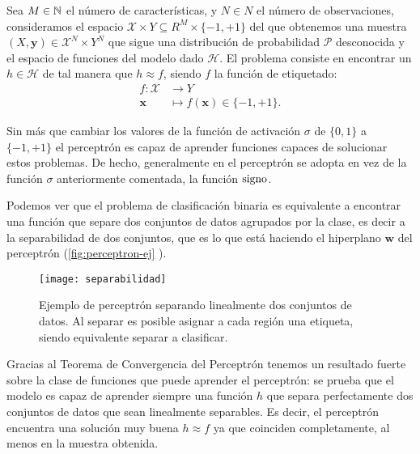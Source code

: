 \begin{definicion}
  Sea $M \in \mathbb{N}$ el número de características, y $N \in N$ el número de observaciones, consideramos el espacio $\mathcal{X} \times Y \subseteq R^M \times \{-1, +1\}$ del que obtenemos una muestra $(X, \textbf{y}) \in \mathcal{X}^N \times Y^N$ que sigue una distribución de probabilidad $\mathcal{P}$ desconocida y el espacio de funciones del modelo dado $\mathcal{H}$. El problema consiste en encontrar un $h \in \mathcal{H}$ de tal manera que $h \approx f$, siendo $f$ la función de etiquetado:
  \begin{align*}
    f : \mathcal{X} & \to Y \\
    \textbf{x} & \mapsto f(\textbf{x}) \in \{-1, +1\}.
  \end{align*}
  \label{def:clasbin}
\end{definicion}

Sin más que cambiar los valores de la función de activación $\sigma$ de $\{0, 1\}$ a $\{-1, +1\}$ el perceptrón es capaz de aprender funciones capaces de solucionar estos problemas. De hecho, generalmente en el perceptrón se adopta en vez de la función $\sigma$ anteriormente comentada, la función $\operatorname{signo}$.

Podemos ver que el problema de clasificación binaria es equivalente a encontrar una función que separe dos conjuntos de datos agrupados por la clase, es decir a la separabilidad de dos conjuntos, que es lo que está haciendo el hiperplano $\textbf{w}$ del perceptrón (\autoref{fig:perceptron-ej} \cite{wikipedia2017separ}).

\begin{figure}[htpb]
  \centering
  \texttt{[image: separabilidad]}
  \caption{Ejemplo de perceptrón separando linealmente dos conjuntos de datos. Al separar es posible asignar a cada región una etiqueta, siendo equivalente separar a clasificar.}
  \label{fig:perceptron-ej}
\end{figure}

Gracias al Teorema de Convergencia del Perceptrón \cite{novikoff1963convergence} tenemos un resultado fuerte sobre la clase de funciones que puede aprender el perceptrón: se prueba que el modelo es capaz de aprender siempre una función $h$ que separa perfectamente dos conjuntos de datos que sean linealmente separables. Es decir, el perceptrón encuentra una solución muy buena $h \approx f$ ya que coinciden completamente, al menos en la muestra obtenida.

